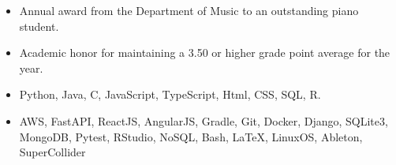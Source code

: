 \documentclass[10pt,a4paper,ragged2e]{altacv}
\begin{document}
\smallskip
{}
\begin{itemize}
\item Annual award from the Department of Music to an outstanding piano student.
\end{itemize}
\smallskip
{}
\begin{itemize}
\item Academic honor for maintaining a 3.50 or higher grade point average for the year.
\end{itemize}

\begin{itemize}
\item Python, Java, C, JavaScript, TypeScript, Html, CSS, SQL, R.
\item AWS, FastAPI, ReactJS, AngularJS, Gradle, Git, Docker, Django, SQLite3, MongoDB, Pytest, RStudio, NoSQL, Bash, \LaTeX, LinuxOS, Ableton, SuperCollider
\end{itemize}










\end{document}
